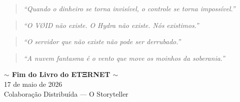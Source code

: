 \documentclass[12pt,a4paper,twoside]{book}
\theoremstyle{remark}
\begin{document}
\begin{quote}
\textit{``Quando o dinheiro se torna invis\'ivel, o controle se torna imposs\'ivel.''}
\end{quote}

\begin{quote}
\textit{``O V{\O}ID n\~{a}o existe. O Hydra n\~{a}o existe. N\'os existimos.''}
\end{quote}

\begin{quote}
\textit{``O servidor que n\~{a}o existe n\~{a}o pode ser derrubado.''}
\end{quote}

\begin{quote}
\textit{``A nuvem fantasma \'e o vento que move os moinhos da soberania.''}
\end{quote}

\vspace{1cm}
\begin{center}
\textbf{$\sim$ Fim do Livro do ETΞRNET $\sim$} \\[0.5cm]
17 de maio de 2026 \\
Colabora\c{c}\~{a}o Distribu\'ida — O Storyteller
\end{center}
\end{document}
